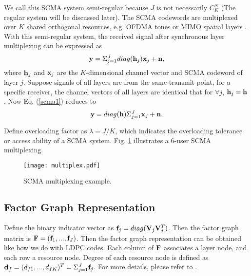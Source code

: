 \documentclass[journal,twoside]{IEEEtran}
\begin{document}
We call this SCMA system semi-regular because $J$ is not necessarily $C^{N}_{K}$ (The regular system will be discussed later). The SCMA codewords are multiplexed over $K$ shared orthogonal resources, e.g. OFDMA tones or MIMO spatial layers \cite{nikopour2014scma}. With this semi-regular system, the received signal after synchronous layer multiplexing can be expressed as
\begin{equation}\label{scma1}
{\bf{y}} = \Sigma^{J}_{j=1}diag({\bf{h}}_{j}){\bf{x}}_{j} + {\bf{n}},
\end{equation}
where ${\bf{h}}_{j}$ and ${\bf{x}}_{j}$ are the $K$-dimensional channel vector and SCMA codeword of layer $j$. Suppose signals of all layers are from the same transmit point, for a specific receiver, the channel vectors of all layers are identical that for $\forall j$, ${\bf{h}}_j = {\bf{h}}$. Now Eq. (\ref{scma1}) reduces to
\begin{equation}
{\bf{y}} = diag({\bf{h}})\Sigma^{J}_{j=1}{\bf{x}}_{j} + {\bf{n}}.
\end{equation}

Define overloading factor as $\lambda = J/K$, which indicates the overloading tolerance or access ability of a SCMA system. Fig. \ref{fig:multiplex} illustrates a $6$-user SCMA multiplexing.
\begin{figure}[htbp]
\centering
\texttt{[image: multiplex.pdf]}
\caption{\label{fig:multiplex}SCMA multiplexing example.}
\end{figure}

\subsection{Factor Graph Representation}
Define the binary indicator vector as ${\bf{f}}_j = diag({\bf{V}}_j{\bf{V}}^{T}_{j})$. Then the factor graph matrix is ${\bf{F}} = ({\bf{f}}_1,...,{\bf{f}}_J)$. Then the factor graph representation can be obtained like how we do with LDPC codes. Each column of ${\bf{F}}$ associates a layer node, and each row a resource node. Degree of each resource node is defined as ${\bf{d}}_{f} = (d_{f1},...,d_{fK})^{T} = \Sigma^{J}_{j=1}{\bf{f}}_j$. For more details, please refer to \cite{nikopour2013sparse}.
\end{document}
